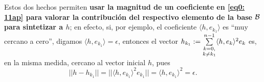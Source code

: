 \begin{nota}
Estos dos hechos permiten \textbf{usar la magnitud de un coeficiente en 
\eqref{eq0: 11ap} para valorar la contribución del respectivo 
elemento de la base $\mathcal{B}$ para sintetizar a $h$};
en efecto, si, por ejemplo, el coeficiente $\langle h, e_{k_{1}} \rangle$
es ``muy cercano a cero'', digamos $\langle h, e_{k_{1}} \rangle = \epsilon$,  
entonces el vector 
$h_{k_{1}}:= \sum\limits_{\substack{ {k=0}, \\  {k \neq k_{1}} }}^{n-1}
\langle h , e_{k} \rangle^{2} e_{k}$
es, en la misma medida, cercano al vector inicial $h$, pues
\[
|| h - h_{k_{1}} || = || \langle h , e_{k_{1}} \rangle^{2} e_{k_{1}} ||
= \langle h , e_{k_{1}} \rangle^{2} = \epsilon.
\]
\end{nota}


\begin{comment}
Ya estamos listos par dar un ejemplo de una BON que
no es una base de Hamel.

\begin{ejemplo}
(de un subconjunto de un espacio
con producto punto que sea maximal ortonormal pero no maximal l.i.)
\TODO{Dónde introduzco al espacio de sucesiones $\ell^{2}$??
Yo creo que justo después de G-S, o sea, justo antes de esta.}

Considere al espacio de Hilbert
\[
\ell^{2}= \{ x: \IN \longrightarrow \IR | \hspace{0.2cm} 
\suma{k=1}{\infty}{|x_{k}|^{2}}< \infty \}
\]

con el producto punto
\[
<x,y>= \suma{k=1}{\infty}{x_{k}y_{k}}.
\]

Sea el subconjunto de este
\[
\cali{B}:= \{e_{i}: \IN \longrightarrow \IR| \hspace{0.2cm} i \in \IN \},
\]

donde $e_{i}$ es la sucesión dada por la regla
\[
e_{i}(j)=\delta_{i,j}, \hspace{0.4cm} j \in \IN.
\]


\begin{itemize}
\item[i)]($\cali{B}$ es un subconjunto maximal ortonormal) 
Claro que todos los elementos de $\cali{B}$ tienen norma uno;
además, si $x \in \ell^{2}$ es tal que para todo índice $i$
se tiene la igualdad
\[
x_{i}= \suma{k=1}{\infty}{x(k)e_{i}(k)}=<x,e_{i}>=0,
\]
entonces $x$ es la sucesión cero, o sea,
el elemento cero del espacio
$\ell^{2}$. Según la equivalencia
$a) \iff b)$ del teorema \ref{thm: Coway, 4.13}, esto basta
para demostrar que $\cali{B}$ es BON de $\ell^{2}$.

\item

\end{itemize}


\TODO{AAAAA}

\end{ejemplo}
\end{comment}


